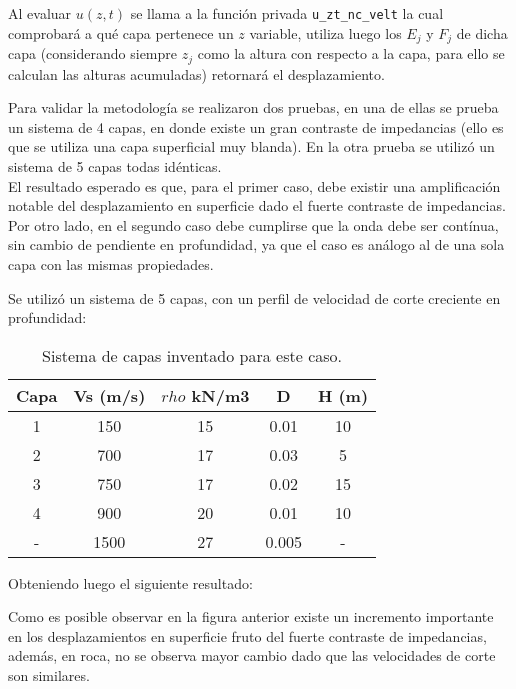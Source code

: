 Al evaluar $u(z,t)$ se llama a la función privada \texttt{u\_zt\_nc\_velt} la cual comprobará a qué capa pertenece un $z$ variable, utiliza luego los $E_j$ y $F_j$ de dicha capa (considerando siempre $z_j$ como la altura con respecto a la capa, para ello se calculan las alturas acumuladas) retornará el desplazamiento.


Para validar la metodología se realizaron dos pruebas, en una de ellas se prueba un sistema de 4 capas, en donde existe un gran contraste de impedancias (ello es que se utiliza una capa superficial muy blanda). En la otra prueba se utilizó un sistema de 5 capas todas idénticas. \\

El resultado esperado es que, para el primer caso, debe existir una amplificación notable del desplazamiento en superficie dado el fuerte contraste de impedancias. Por otro lado, en el segundo caso debe cumplirse que la onda debe ser contínua, sin cambio de pendiente en profundidad, ya que el caso es análogo al de una sola capa con las mismas propiedades.


Se utilizó un sistema de 5 capas, con un perfil de velocidad de corte creciente en profundidad:

\begin{table}[H]
	\centering
	\caption{Sistema de capas inventado para este caso.}
	\begin{tabular}{ccccc}
		\hline
		\textbf{Capa} & \textbf{Vs (m/s)} & \boldmath{}\textbf{$rho$ kN/m3}\unboldmath{} & \textbf{D} & \textbf{H (m)} \bigstrut\\
		\hline
		1     & 150   & 15    & 0.01  & 10 \bigstrut[t]\\
		2     & 700   & 17    & 0.03  & 5 \\
		3     & 750   & 17    & 0.02  & 15 \\
		4     & 900   & 20    & 0.01  & 10 \\
		-     & 1500  & 27    & 0.005 & - \bigstrut[b]\\
		\hline
	\end{tabular}
\end{table}

Obteniendo luego el siguiente resultado:


Como es posible observar en la figura anterior existe un incremento importante en los desplazamientos en superficie fruto del fuerte contraste de impedancias, además, en roca, no se observa mayor cambio dado que las velocidades de corte son similares.

